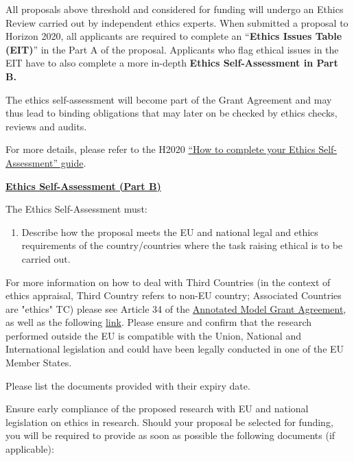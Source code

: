 \medskip\noindent
All proposals above threshold and considered for funding will undergo an Ethics Review carried out by independent ethics experts. 
When submitted a proposal to Horizon 2020, all applicants are required to complete an ``{\bf Ethics Issues Table (EIT)}'' in the Part A of the proposal. 
Applicants who flag ethical issues in the EIT have to also complete a more in-depth {\bf Ethics Self-Assessment in Part B.}

\medskip\noindent
The ethics self-assessment will become part of the Grant Agreement and may thus lead to binding obligations that may later on be checked by ethics checks, reviews and audits.

\medskip\noindent
For more details, please refer to the H2020
\href{http://ec.europa.eu/research/participants/data/ref/h2020/grants_manual/hi/ethics/h2020_hi_ethics-self-assess_en.pdf}{``How
to complete your Ethics Self-Assessment'' guide}.

\bigskip\noindent
{\large {\bf \ul{Ethics Self-Assessment (Part B)}}}

\medskip\noindent
The Ethics Self-Assessment must:

{\bf
\begin{enumerate}
  \item Describe how the proposal meets the EU and national legal and ethics requirements of the country/countries where the task raising ethical is to be carried out.
\end{enumerate}
}

\medskip\noindent
For more information on how to deal with Third Countries (in the
context of ethics appraisal, Third Country refers to non-EU
country; Associated Countries are "ethics" TC) please see Article
34 of the
\href{http://ec.europa.eu/research/participants/data/ref/h2020/grants_manual/amga/h2020-amga_en.pdf}{Annotated
Model Grant Agreement}, as well as the following
\href{http://ec.europa.eu/justice/data-protection/international-transfers/adequacy/index_en.htm}{link}.
Please ensure and confirm that the research performed outside the
EU is compatible with the Union, National and International
legislation and could have been legally conducted in one of the EU
Member States.

\medskip\noindent
Please list the documents provided with their expiry date.

\medskip\noindent
Ensure early compliance of the proposed research with EU and
national legislation on ethics in research.  Should your proposal
be selected for funding, you will be required to provide as soon
as possible the following documents (if applicable): 

